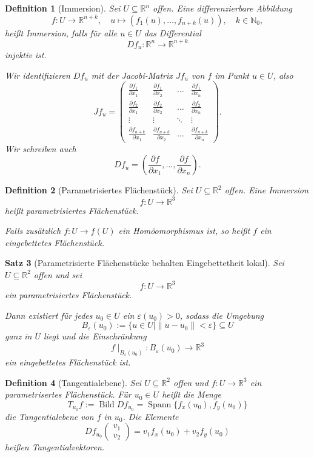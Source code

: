 \documentclass[a4paper,12pt]{article}
\theoremstyle{break}
\newtheorem{definition}{Definition}[section]
\newtheorem{theorem}[definition]{Satz}
\begin{document}
\begin{definition}[Immersion]
Sei \( U \subseteq \mathbb{R}^n \) offen. Eine differenzierbare Abbildung  
\[
f: U \to \mathbb{R}^{n+k}, \quad u \mapsto (f_1(u), \dots, f_{n+k}(u)), \quad k \in \mathbb{N}_0,
\]
heißt \emph{Immersion}, falls für alle \( u \in U \) das Differential  
\[
Df_u: \mathbb{R}^n \to \mathbb{R}^{n+k}
\]
injektiv ist.  

Wir identifizieren \( Df_u \) mit der Jacobi-Matrix \( Jf_u \) von \( f \) im Punkt \( u \in U \), also  
\[
Jf_u =
\begin{pmatrix}
\frac{\partial f_1}{\partial x_1} & \frac{\partial f_1}{\partial x_2} & \dots & \frac{\partial f_1}{\partial x_n} \\
\frac{\partial f_2}{\partial x_1} & \frac{\partial f_2}{\partial x_2} & \dots & \frac{\partial f_2}{\partial x_n} \\
\vdots & \vdots & \ddots & \vdots \\
\frac{\partial f_{n+k}}{\partial x_1} & \frac{\partial f_{n+k}}{\partial x_2} & \dots & \frac{\partial f_{n+k}}{\partial x_n}
\end{pmatrix}.
\]
Wir schreiben auch  
\[
Df_u = \left( \frac{\partial f}{\partial x_1}, \dots, \frac{\partial f}{\partial x_n} \right).
\]
\end{definition}

\begin{definition}[Parametrisiertes Flächenstück]
Sei \( U \subseteq \mathbb{R}^2 \) offen.  
Eine Immersion  
\[
f: U \to \mathbb{R}^3
\]
heißt \emph{parametrisiertes Flächenstück}.  

Falls zusätzlich \( f: U \to f(U) \) ein Homöomorphismus ist, so heißt \( f \) ein \emph{eingebettetes Flächenstück}.
\end{definition}

\begin{theorem}[Parametrisierte Flächenstücke behalten Eingebettetheit lokal]
Sei \( U \subseteq \mathbb{R}^2 \) offen und sei  
\[
f: U \to \mathbb{R}^3
\]
ein parametrisiertes Flächenstück.  

Dann existiert für jedes \( u_0 \in U \) ein \( \varepsilon(u_0) > 0 \), sodass die Umgebung  
\[
B_{\varepsilon}(u_0) := \{ u \in U \mid \| u - u_0 \| < \varepsilon \} \subseteq U
\]
ganz in \( U \) liegt und die Einschränkung  
\[
f \mid_{B_{\varepsilon}(u_0)}: B_{\varepsilon}(u_0) \to \mathbb{R}^3
\]
ein eingebettetes Flächenstück ist.
\end{theorem}

\begin{definition}[Tangentialebene]
    Sei \( U \subseteq \mathbb{R}^2 \) offen und \( f: U \to \mathbb{R}^3 \) ein parametrisertes Flächenstück. 
    Für \( u_0 \in U \) heißt die Menge 
    \[
        T_{u_0} f := \operatorname{Bild} Df_{u_0} = \operatorname{Spann} \{ f_x(u_0), f_y(u_0) \}
    \]
    die \emph{Tangentialebene} von \( f \) in \( u_0 \).
    Die Elemente
    \[
        Df_{u_0} 
        \begin{pmatrix} v_1 \\ v_2 \end{pmatrix} 
        = v_1 f_x(u_0) + v_2 f_y(u_0)
    \]
    heißen \emph{Tangentialvektoren}.
\end{definition}
\end{document}
